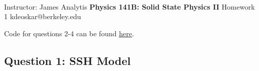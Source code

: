 \documentclass[11pt]{article}
\begin{document}
\thispagestyle{empty}
\bigskip \
\vspace{0.1cm}

\begin{center}
{\fontsize{14}{14} \selectfont Instructor: James Analytis}
\vskip 16pt
{\fontsize{28}{28} \selectfont \bf \sffamily Physics 141B: Solid State Physics II}
\vskip 24pt
{\fontsize{14}{14} \selectfont \rmfamily Homework 1} 
\vskip 6pt
{\fontsize{14}{14} \selectfont \ttfamily kdeoskar@berkeley.edu} 
\vskip 24pt
\end{center}



\begin{bluebox}
  Code for questions 2-4 can be found \href{https://github.com/kdeoskar/notes/tree/main/Physics%20141B/HW1/code}{here}.
\end{bluebox}

\subsection*{Question 1: SSH Model}
\end{document}
